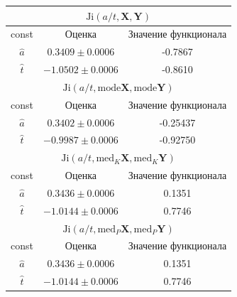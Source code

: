 \documentclass[10pt]{article}
\begin{document}
\begin{center}
\begin{tabular}{|c|c|c|}
\hline
\multicolumn{3}{|c|}{$\text{Ji} (a/t, \mathbf{X}, \mathbf{Y})$ }\\
\hline
const&Оценка&Значение функционала\\
\hline
$\hat{a}$&$ 0.3409\pm0.0006$&-0.7867\\
\hline
$\hat{t}$&$-1.0502\pm0.0006$&-0.8610\\
\hline
\hline
\multicolumn{3}{|c|}{$\text{Ji} (a/t, \text{mode} \mathbf{X}, \text{mode} \mathbf{Y})$ }\\
\hline
const&Оценка&Значение функционала\\
\hline
$\hat{a}$&$0.3402\pm0.0006$&-0.25437\\
\hline
$\hat{t}$&$-0.9987\pm0.0006$&-0.92750\\
\hline
\hline
\multicolumn{3}{|c|}{$\text{Ji} (a/t, \text{med}_K \mathbf{X}, \text{med}_K \mathbf{Y})$}\\
\hline
const&Оценка&Значение функционала\\
\hline
$\hat{a}$&$0.3436\pm0.0006$&0.1351\\
\hline
\hline
$\hat{t}$&$-1.0144\pm0.0006$&0.7746\\
\hline
\multicolumn{3}{|c|}{$\text{Ji} (a/t, \text{med}_P \mathbf{X}, \text{med}_P \mathbf{Y})$}\\
\hline
const&Оценка&Значение функционала\\
\hline
$\hat{a}$&$0.3436\pm0.0006$&0.1351\\
\hline
$\hat{t}$&$-1.0144\pm0.0006$&0.7746\\
\hline
\end{tabular}
\end{center}
\end{document}
